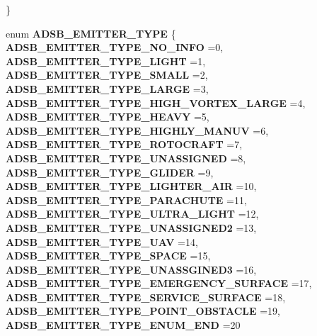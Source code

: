 \begin{DoxyCompactItemize}
 \}
\item 
enum \textbf{ A\+D\+S\+B\+\_\+\+E\+M\+I\+T\+T\+E\+R\+\_\+\+T\+Y\+PE} \{ \newline
\textbf{ A\+D\+S\+B\+\_\+\+E\+M\+I\+T\+T\+E\+R\+\_\+\+T\+Y\+P\+E\+\_\+\+N\+O\+\_\+\+I\+N\+FO} =0, 
\textbf{ A\+D\+S\+B\+\_\+\+E\+M\+I\+T\+T\+E\+R\+\_\+\+T\+Y\+P\+E\+\_\+\+L\+I\+G\+HT} =1, 
\textbf{ A\+D\+S\+B\+\_\+\+E\+M\+I\+T\+T\+E\+R\+\_\+\+T\+Y\+P\+E\+\_\+\+S\+M\+A\+LL} =2, 
\textbf{ A\+D\+S\+B\+\_\+\+E\+M\+I\+T\+T\+E\+R\+\_\+\+T\+Y\+P\+E\+\_\+\+L\+A\+R\+GE} =3, 
\newline
\textbf{ A\+D\+S\+B\+\_\+\+E\+M\+I\+T\+T\+E\+R\+\_\+\+T\+Y\+P\+E\+\_\+\+H\+I\+G\+H\+\_\+\+V\+O\+R\+T\+E\+X\+\_\+\+L\+A\+R\+GE} =4, 
\textbf{ A\+D\+S\+B\+\_\+\+E\+M\+I\+T\+T\+E\+R\+\_\+\+T\+Y\+P\+E\+\_\+\+H\+E\+A\+VY} =5, 
\textbf{ A\+D\+S\+B\+\_\+\+E\+M\+I\+T\+T\+E\+R\+\_\+\+T\+Y\+P\+E\+\_\+\+H\+I\+G\+H\+L\+Y\+\_\+\+M\+A\+N\+UV} =6, 
\textbf{ A\+D\+S\+B\+\_\+\+E\+M\+I\+T\+T\+E\+R\+\_\+\+T\+Y\+P\+E\+\_\+\+R\+O\+T\+O\+C\+R\+A\+FT} =7, 
\newline
\textbf{ A\+D\+S\+B\+\_\+\+E\+M\+I\+T\+T\+E\+R\+\_\+\+T\+Y\+P\+E\+\_\+\+U\+N\+A\+S\+S\+I\+G\+N\+ED} =8, 
\textbf{ A\+D\+S\+B\+\_\+\+E\+M\+I\+T\+T\+E\+R\+\_\+\+T\+Y\+P\+E\+\_\+\+G\+L\+I\+D\+ER} =9, 
\textbf{ A\+D\+S\+B\+\_\+\+E\+M\+I\+T\+T\+E\+R\+\_\+\+T\+Y\+P\+E\+\_\+\+L\+I\+G\+H\+T\+E\+R\+\_\+\+A\+IR} =10, 
\textbf{ A\+D\+S\+B\+\_\+\+E\+M\+I\+T\+T\+E\+R\+\_\+\+T\+Y\+P\+E\+\_\+\+P\+A\+R\+A\+C\+H\+U\+TE} =11, 
\newline
\textbf{ A\+D\+S\+B\+\_\+\+E\+M\+I\+T\+T\+E\+R\+\_\+\+T\+Y\+P\+E\+\_\+\+U\+L\+T\+R\+A\+\_\+\+L\+I\+G\+HT} =12, 
\textbf{ A\+D\+S\+B\+\_\+\+E\+M\+I\+T\+T\+E\+R\+\_\+\+T\+Y\+P\+E\+\_\+\+U\+N\+A\+S\+S\+I\+G\+N\+E\+D2} =13, 
\textbf{ A\+D\+S\+B\+\_\+\+E\+M\+I\+T\+T\+E\+R\+\_\+\+T\+Y\+P\+E\+\_\+\+U\+AV} =14, 
\textbf{ A\+D\+S\+B\+\_\+\+E\+M\+I\+T\+T\+E\+R\+\_\+\+T\+Y\+P\+E\+\_\+\+S\+P\+A\+CE} =15, 
\newline
\textbf{ A\+D\+S\+B\+\_\+\+E\+M\+I\+T\+T\+E\+R\+\_\+\+T\+Y\+P\+E\+\_\+\+U\+N\+A\+S\+S\+G\+I\+N\+E\+D3} =16, 
\textbf{ A\+D\+S\+B\+\_\+\+E\+M\+I\+T\+T\+E\+R\+\_\+\+T\+Y\+P\+E\+\_\+\+E\+M\+E\+R\+G\+E\+N\+C\+Y\+\_\+\+S\+U\+R\+F\+A\+CE} =17, 
\textbf{ A\+D\+S\+B\+\_\+\+E\+M\+I\+T\+T\+E\+R\+\_\+\+T\+Y\+P\+E\+\_\+\+S\+E\+R\+V\+I\+C\+E\+\_\+\+S\+U\+R\+F\+A\+CE} =18, 
\textbf{ A\+D\+S\+B\+\_\+\+E\+M\+I\+T\+T\+E\+R\+\_\+\+T\+Y\+P\+E\+\_\+\+P\+O\+I\+N\+T\+\_\+\+O\+B\+S\+T\+A\+C\+LE} =19, 
\newline
\textbf{ A\+D\+S\+B\+\_\+\+E\+M\+I\+T\+T\+E\+R\+\_\+\+T\+Y\+P\+E\+\_\+\+E\+N\+U\+M\+\_\+\+E\+ND} =20

\end{DoxyCompactItemize}
